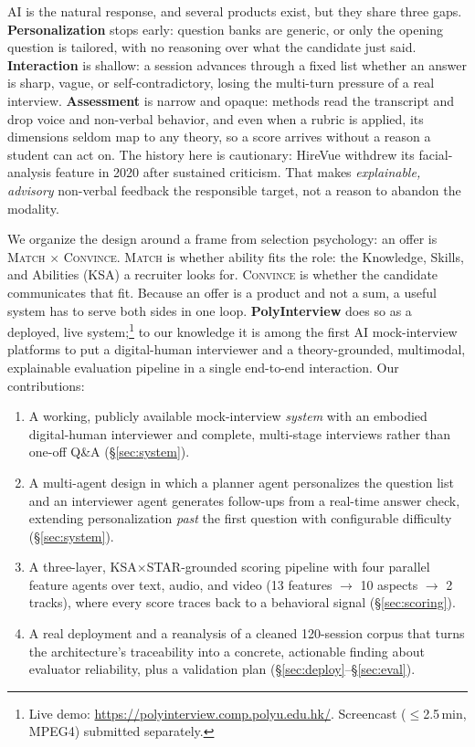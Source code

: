 \documentclass[11pt]{article}
\begin{document}
AI is the natural response, and several products exist, but they share three gaps. \textbf{Personalization} stops early: question banks are generic, or only the opening question is tailored, with no reasoning over what the candidate just said. \textbf{Interaction} is shallow: a session advances through a fixed list whether an answer is sharp, vague, or self-contradictory, losing the multi-turn pressure of a real interview. \textbf{Assessment} is narrow and opaque: methods read the transcript and drop voice and non-verbal behavior, and even when a rubric is applied, its dimensions seldom map to any theory, so a score arrives without a reason a student can act on. The history here is cautionary: HireVue withdrew its facial-analysis feature in 2020 after sustained criticism. That makes \emph{explainable, advisory} non-verbal feedback the responsible target, not a reason to abandon the modality.

We organize the design around a frame from selection psychology: an offer is \textsc{Match} $\times$ \textsc{Convince}. \textsc{Match} is whether ability fits the role: the Knowledge, Skills, and Abilities (KSA) a recruiter looks for. \textsc{Convince} is whether the candidate communicates that fit. Because an offer is a product and not a sum, a useful system has to serve both sides in one loop. \textbf{PolyInterview} does so as a deployed, live system;\footnote{Live demo: \url{https://polyinterview.comp.polyu.edu.hk/}. Screencast ($\leq$2.5\,min, MPEG4) submitted separately.} to our knowledge it is among the first AI mock-interview platforms to put a digital-human interviewer and a theory-grounded, multimodal, explainable evaluation pipeline in a single end-to-end interaction. Our contributions:
\begin{enumerate}[noitemsep,topsep=2pt,leftmargin=*]
  \item A working, publicly available mock-interview \emph{system} with an embodied digital-human interviewer and complete, multi-stage interviews rather than one-off Q\&A (\S\ref{sec:system}).
  \item A multi-agent design in which a planner agent personalizes the question list and an interviewer agent generates follow-ups from a real-time answer check, extending personalization \emph{past} the first question with configurable difficulty (\S\ref{sec:system}).
  \item A three-layer, KSA$\times$STAR-grounded scoring pipeline with four parallel feature agents over text, audio, and video (13 features $\rightarrow$ 10 aspects $\rightarrow$ 2 tracks), where every score traces back to a behavioral signal (\S\ref{sec:scoring}).
  \item A real deployment and a reanalysis of a cleaned 120-session corpus that turns the architecture's traceability into a concrete, actionable finding about evaluator reliability, plus a validation plan (\S\ref{sec:deploy}--\S\ref{sec:eval}).
\end{enumerate}
\end{document}
